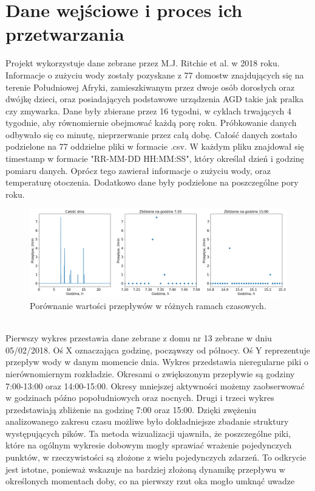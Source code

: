 \documentclass[a4paper,twoside,12pt]{book}
\begin{document}
\section{Dane wejściowe i proces ich przetwarzania}
Projekt wykorzystuje dane zebrane przez M.J. Ritchie et al.\cite{bib:artykul_dane} w 2018 roku. Informacje o zużyciu wody zostały pozyskane z 77 domostw znajdujących się na terenie Południowej Afryki, zamieszkiwanym przez dwoje osób dorosłych oraz dwójkę dzieci, oraz posiadających podstawowe urządzenia AGD takie jak pralka czy zmywarka. Dane były zbierane przez 16 tygodni, w cyklach trwających 4 tygodnie, aby równomiernie obejmować każdą porę roku. Próbkowanie danych odbywało się co minutę, nieprzerwanie przez całą dobę. Całość danych zostało podzielone na 77 oddzielne pliki w formacie .csv. W każdym pliku znajdował się timestamp w formacie "RR-MM-DD HH:MM:SS", który określał dzień i godzinę pomiaru danych. Oprócz tego zawierał informacje o zużyciu wody, oraz temperaturę otoczenia. Dodatkowo dane były podzielone na poszczególne pory roku.\\
\begin{figure}[!h]
  \centering
  \includegraphics[width=1\textwidth]{img/Dane_nowe_disp.png}
  \caption{Porównanie wartości przepływów w różnych ramach czasowych.}
  \label{fig:etykieta-rysunku}
\end{figure}\\
Pierwszy wykres przestawia dane zebrane z domu nr 13 zebrane w dniu 05/02/2018. Oś X oznaczająca godzinę, począwszy od północy. Oś Y reprezentuje przepływ wody w danym momencie dnia. Wykres przedstawia nieregularne piki o nierównomiernym rozkładzie. Okresami o zwiększonym przepływie są godziny 7:00-13:00 oraz 14:00-15:00. Okresy mniejszej aktywności możemy zaobserwować w godzinach późno popołudniowych oraz nocnych. Drugi i trzeci wykres przedstawiają zbliżenie na godzinę 7:00 oraz 15:00. Dzięki zwężeniu analizowanego zakresu czasu możliwe było dokładniejsze zbadanie struktury występujących pików. Ta metoda wizualizacji ujawniła, że poszczególne piki, które na ogólnym wykresie dobowym mogły sprawiać wrażenie pojedynczych punktów, w rzeczywistości są złożone z wielu pojedynczych zdarzeń. To odkrycie jest istotne, ponieważ wskazuje na bardziej złożoną dynamikę przepływu w określonych momentach doby, co na pierwszy rzut oka mogło umknąć uwadze\\
\end{document}
